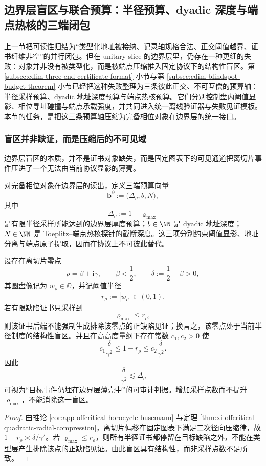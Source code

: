 \subsection{边界层盲区与联合预算：半径预算、dyadic 深度与端点热核的三端闭包}\label{subsec:typed-address-biaxial-completion-boundary-joint-budget}
上一节把可读性归结为“类型化地址被接纳、记录轴规格合法、正交阈值越界、证书纤维非空”的并行闭包。但在 unitary-slice 的边界层里，仍存在一种更细的失败：对象并非没有被类型化，而是被端点压缩推入固定协议下的结构性盲区。第 \ref{subsec:cdim-three-end-certificate-format} 小节与第 \ref{subsec:cdim-blindspot-budget-theorem} 小节已经把这种失败整理为三条彼此正交、不可互偿的预算轴：半径采样预算、dyadic 地址深度预算与端点热核预算。它们分别控制盘内阈值显影、相位寻址碰撞与端点承载强度，并共同进入统一离线验证器与失败见证模板。本节的任务，是把这三条预算轴压缩为完备相位对象在边界层的统一接口。

\subsubsection{盲区并非缺证，而是压缩后的不可见域}\label{subsubsec:typed-address-biaxial-completion-boundary-blindspot}
边界层盲区的本质，并不是证书对象缺失，而是固定图表下的可见通道把离切片事件压进了一个无法由当前协议显影的薄壳。

\begin{definition}[边界层预算向量]\label{def:typed-address-biaxial-completion-boundary-budget-vector}
对完备相位对象在边界层的读出，定义三端预算向量
\[
\mathbf b^{\partial}:=
\bigl(
\Delta_{\varrho},
b,
N
\bigr),
\]
其中
\[
\Delta_{\varrho}:=1-\varrho_{\max}
\]
是有限半径采样所能达到的边界层厚度预算；\(b\in\NN\) 是 dyadic 地址深度；\(N\in\NN\) 是 Toeplitz--端点热核探针的截断深度。这三项分别约束阈值显影、地址分离与端点原子提取，因而在协议上不可彼此替代。
\end{definition}

\begin{proposition}[盲区的结构性来源]\label{prop:typed-address-biaxial-completion-boundary-blindspot}
设存在离切片零点
\[
\rho=\beta+\mathrm{i}\gamma,
\qquad
\beta<\frac12,
\qquad
\delta:=\frac12-\beta>0,
\]
其圆盘像记为 \(w_{\rho}\in\DD\)，并记阈值半径
\[
r_{\rho}:=|w_{\rho}|\in(0,1).
\]
若有限缺陷证书只采样到
\[
\varrho_{\max}\le r_{\rho},
\]
则该证书后端不能强制生成排除该零点的正缺陷见证；换言之，该零点处于当前半径制度的结构性盲区。并且在高高度量纲下存在常数 \(c_1,c_2>0\) 使
\[
c_1\frac{\delta}{\gamma^2}\le 1-r_{\rho}\le c_2\frac{\delta}{\gamma^2}.
\]
因此
\[
\frac{\delta}{\gamma^2}\lesssim \Delta_{\varrho}
\]
可视为“目标事件仍埋在边界层薄壳中”的可审计判据。增加采样点数而不提升 \(\varrho_{\max}\)，不能消除这一盲区。
\end{proposition}
\begin{proof}
由推论 \ref{cor:app-offcritical-horocycle-busemann} 与定理 \ref{thm:xi-offcritical-quadratic-radial-compression}，离切片偏移在固定图表下满足二次径向压缩律，故 \(1-r_{\rho}\asymp \delta/\gamma^2\)。若 \(\varrho_{\max}\le r_{\rho}\)，则所有半径证书都停留在目标缺陷之外，不能在类型层产生排除该点的正缺陷见证。由此盲区具有结构性，而非采样点数不足所致。
\end{proof}

